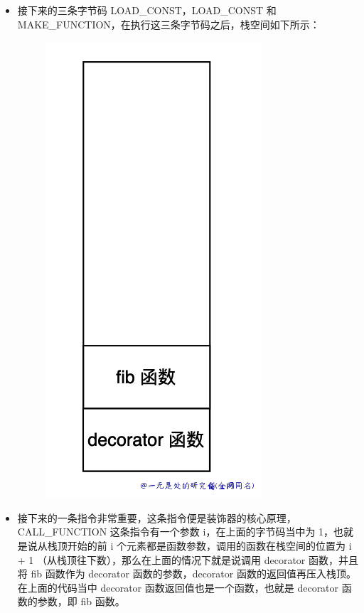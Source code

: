 \begin{itemize}
\item 接下来的三条字节码 LOAD\_CONST，LOAD\_CONST 和 MAKE\_FUNCTION，在执行这三条字节码之后，栈空间如下所示： 

    \begin{figure}[H]
        \centering
            \includegraphics[scale=.25]{images/52-bytecode.png}
						\caption{ }
        \label{fig:my_label}
    \end{figure}
    
\item 接下来的一条指令非常重要，这条指令便是装饰器的核心原理，CALL\_FUNCTION 这条指令有一个参数 i，在上面的字节码当中为 1，也就是说从栈顶开始的前 i 个元素都是函数参数，调用的函数在栈空间的位置为 i + 1 （从栈顶往下数），那么在上面的情况下就是说调用 decorator 函数，并且将 fib 函数作为 decorator 函数的参数，decorator 函数的返回值再压入栈顶。在上面的代码当中 decorator 函数返回值也是一个函数，也就是 decorator 函数的参数，即 fib 函数。 


\end{itemize}
